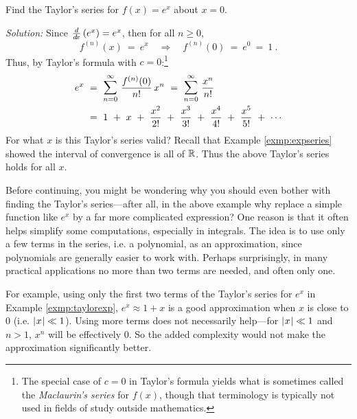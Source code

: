 \newpage
\begin{exmp}\label{exmp:taylorexp}
\noindent Find the Taylor's series for $f(x)=e^x$ about $x=0$.\vspace{1mm}
\par\noindent\emph{Solution:} Since $\frac{d}{d\!x}\,(e^x) = e^x$, then for all $n\ge 0$,
\[
f^{(n)}(x) ~=~ e^x \quad\Rightarrow\quad f^{(n)}(0) ~=~ e^0 ~=~ 1 ~.
\]
Thus, by Taylor's formula with $c=0$:\footnote{The special case of $c=0$ in
Taylor's formula yields what is sometimes called the \emph{Maclaurin's series}
for $f(x)$, though that terminology is typically not
used in fields of study outside mathematics.}
\begin{align*}
e^x ~&=~ \bigsum{n=0}{\infty}~ \frac{f^{(n)}(0)}{n !}\,x^n ~=~
\bigsum{n=0}{\infty}~ \frac{x^n}{n !}\\
&=~ 1 ~+~ x ~+~ \frac{x^2}{2 !} ~+~ \frac{x^3}{3 !} ~+~ \frac{x^4}{4 !} ~+~
\frac{x^5}{5 !} ~+~ \cdots
\end{align*}
For what $x$ is this Taylor's series valid? Recall that Example
\ref{exmp:expseries} showed the interval of convergence is all of $\mathbb{R}$. Thus
the above Taylor's series holds for all $x$.
\end{exmp}
\divider
\vspace{2mm}

Before continuing, you might be wondering why you should even bother with
finding the Taylor's series---after all, in the above example why replace a
simple function like $e^x$ by a far more complicated expression? One reason is
that it often helps simplify some computations, especially in integrals. The
idea is to use only a few terms in the series, i.e. a polynomial, as an
approximation, since polynomials are generally easier to work with. Perhaps
surprisingly, in many practical applications no more than two terms are needed,
and often only one.

For example, using only the first two terms of the Taylor's series for
$e^x$ in Example \ref{exmp:taylorexp}, $e^x \approx 1 + x$ is a good
approximation when $x$ is close to 0 (i.e. $\lvert\mspace{1mu}x\mspace{1mu}\rvert \ll 1$). Using more terms
does not necessarily help---for $\lvert\mspace{1mu}x\mspace{1mu}\rvert \ll 1$ and $n>1$, $x^n$ will be
effectively 0. So the added complexity would not make the approximation
significantly better.

